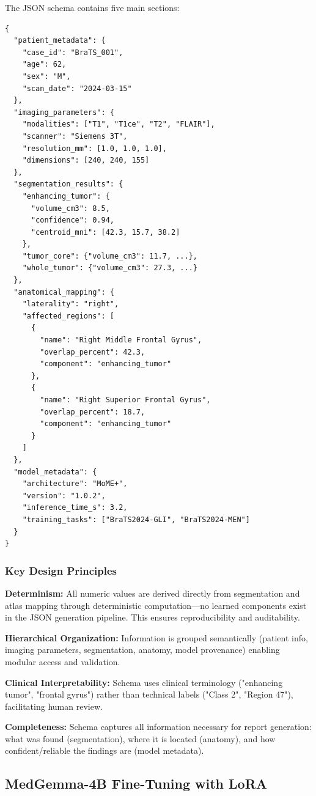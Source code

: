 \documentclass[conference]{IEEEtran}
\begin{document}
The JSON schema contains five main sections:

\begin{verbatim}
{
  "patient_metadata": {
    "case_id": "BraTS_001",
    "age": 62,
    "sex": "M",
    "scan_date": "2024-03-15"
  },
  "imaging_parameters": {
    "modalities": ["T1", "T1ce", "T2", "FLAIR"],
    "scanner": "Siemens 3T",
    "resolution_mm": [1.0, 1.0, 1.0],
    "dimensions": [240, 240, 155]
  },
  "segmentation_results": {
    "enhancing_tumor": {
      "volume_cm3": 8.5,
      "confidence": 0.94,
      "centroid_mni": [42.3, 15.7, 38.2]
    },
    "tumor_core": {"volume_cm3": 11.7, ...},
    "whole_tumor": {"volume_cm3": 27.3, ...}
  },
  "anatomical_mapping": {
    "laterality": "right",
    "affected_regions": [
      {
        "name": "Right Middle Frontal Gyrus",
        "overlap_percent": 42.3,
        "component": "enhancing_tumor"
      },
      {
        "name": "Right Superior Frontal Gyrus",
        "overlap_percent": 18.7,
        "component": "enhancing_tumor"
      }
    ]
  },
  "model_metadata": {
    "architecture": "MoME+",
    "version": "1.0.2",
    "inference_time_s": 3.2,
    "training_tasks": ["BraTS2024-GLI", "BraTS2024-MEN"]
  }
}
\end{verbatim}

\subsubsection{Key Design Principles}

\textbf{Determinism:} All numeric values are derived directly from segmentation and atlas mapping through deterministic computation—no learned components exist in the JSON generation pipeline. This ensures reproducibility and auditability.

\textbf{Hierarchical Organization:} Information is grouped semantically (patient info, imaging parameters, segmentation, anatomy, model provenance) enabling modular access and validation.

\textbf{Clinical Interpretability:} Schema uses clinical terminology ("enhancing tumor", "frontal gyrus") rather than technical labels ("Class 2", "Region 47"), facilitating human review.

\textbf{Completeness:} Schema captures all information necessary for report generation: what was found (segmentation), where it is located (anatomy), and how confident/reliable the findings are (model metadata).

\subsection{MedGemma-4B Fine-Tuning with LoRA}
\end{document}
